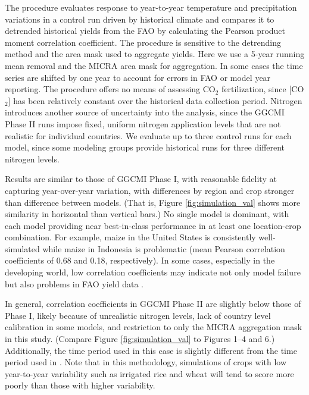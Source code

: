 \documentclass[gmd, manuscript]{copernicus} %
\begin{document}
{The \citet{muller_global_2017} procedure evaluates response to year-to-year temperature and precipitation variations in a control run driven by historical climate and compares it to detrended historical yields from the FAO \citep{FAOSTAT} by calculating the Pearson product moment correlation coefficient. 
The procedure is sensitive to the detrending method and the area mask used to aggregate yields. 
Here we use a 5-year running mean removal and the MICRA area mask for aggregation. 
In some cases the time series are shifted by one year to account for errors in FAO or model year reporting. 
The procedure offers no means of assessing CO$_2$ fertilization, since [CO$_2$] has been relatively constant over the historical data collection period. 
Nitrogen introduces another source of uncertainty into the analysis, since the GGCMI Phase II runs impose fixed, uniform nitrogen application levels that are not realistic for individual countries. 
We evaluate up to three control runs for each model, since some modeling groups provide historical runs for three different nitrogen levels. 

Results are similar to those of GGCMI Phase I, with reasonable fidelity at capturing year-over-year variation, with differences by region and crop stronger than difference between models. 
(That is, Figure \ref{fig:simulation_val} shows more similarity in horizontal than vertical bars.) 
No single model is dominant, with each model providing near best-in-class performance in at least one location-crop combination. 
For example, maize in the United States is consistently well-simulated while maize in Indonesia is problematic (mean Pearson correlation coefficients of 0.68 and 0.18, respectively). 
In some cases, especially in the developing world, low correlation coefficients may indicate not only model failure but also problems in FAO yield data \citep{Ray2012,muller_global_2017}. 

In general, correlation coefficients in GGCMI Phase II are slightly below those of Phase I, likely because of unrealistic nitrogen levels, lack of country level calibration in some models, and restriction to only the MICRA aggregation mask in this study. 
(Compare Figure \ref{fig:simulation_val} to \citet{muller_global_2017} Figures 1--4 and 6.)  
Additionally, the time period used in this case is slightly different from the time period used in \citet{muller_global_2017}. 
Note that in this methodology, simulations of crops with low year-to-year variability such as irrigated rice and wheat will tend to score more poorly than those with higher variability.

}
\end{document}
